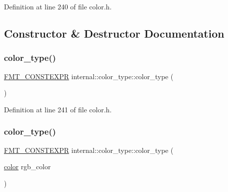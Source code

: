 Definition at line 240 of file color.\+h.



\subsection{Constructor \& Destructor Documentation}
\mbox{\label{structinternal_1_1color__type_a181efa4f00747d5d0fc4f9935859f605}} 
\subsubsection{\texorpdfstring{color\+\_\+type()}{color\_type()}\hspace{0.1cm}{\footnotesize\ttfamily [1/4]}}
{\footnotesize\ttfamily \hyperlink{core_8h_a69201cb276383873487bf68b4ef8b4cd}{F\+M\+T\+\_\+\+C\+O\+N\+S\+T\+E\+X\+PR} internal\+::color\+\_\+type\+::color\+\_\+type (\begin{DoxyParamCaption}{ }\end{DoxyParamCaption})\hspace{0.3cm}{\ttfamily [inline]}}



Definition at line 241 of file color.\+h.

\mbox{\label{structinternal_1_1color__type_a8c0db95d7ceb5c1361978a7690492037}} 
\subsubsection{\texorpdfstring{color\+\_\+type()}{color\_type()}\hspace{0.1cm}{\footnotesize\ttfamily [2/4]}}
{\footnotesize\ttfamily \hyperlink{core_8h_a69201cb276383873487bf68b4ef8b4cd}{F\+M\+T\+\_\+\+C\+O\+N\+S\+T\+E\+X\+PR} internal\+::color\+\_\+type\+::color\+\_\+type (\begin{DoxyParamCaption}\item[{\hyperlink{color_8h_a80d1dc5f416b97f92939a4166d41203c}{color}}]{rgb\+\_\+color }\end{DoxyParamCaption})\hspace{0.3cm}{\ttfamily [inline]}}



